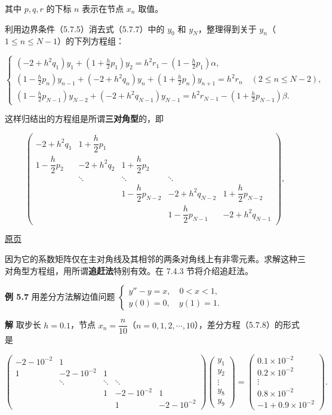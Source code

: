 \documentclass[
  10pt,
  fontset=fandol]{ctexart}
\begin{document}
其中 \(p,q,r\) 的下标 \(n\) 表示在节点 \(x_n\) 取值。

利用边界条件（5.7.5）消去式（5.7.7）中的 \(y_0\) 和 \(y_N\)，整理得到关于 \(y_n\)（\(1\le n\le N-1\)）的下列方程组：

\[
\begin{cases}
\displaystyle(-2+h^2q_1)y_1+\left(1+\frac h2p_1\right)y_2=h^2r_1-\left(1-\frac h2p_1\right)\alpha,\\[6pt]
\displaystyle\left(1-\frac h2p_n\right)y_{n-1}+(-2+h^2q_n)y_n+\left(1+\frac h2p_n\right)y_{n+1}=h^2r_n\quad(2\le n\le N-2),\\[6pt]
\displaystyle\left(1-\frac h2p_{N-1}\right)y_{N-2}+(-2+h^2q_{N-1})y_{N-1}=h^2r_{N-1}-\left(1+\frac h2p_{N-1}\right)\beta.
\end{cases}
\tag{5.7.8}
\]

这样归结出的方程组是所谓\textbf{三对角型}的，即

\[
\begin{pmatrix}
-2+h^2q_1 & 1+\dfrac h2p_1 & & & \\
1-\dfrac h2p_2 & -2+h^2q_2 & 1+\dfrac h2p_2 & & \\
& \ddots & \ddots & \ddots & \\
& & 1-\dfrac h2p_{N-2} & -2+h^2q_{N-2} & 1+\dfrac h2p_{N-2} \\
& & & 1-\dfrac h2p_{N-1} & -2+h^2q_{N-1}
\end{pmatrix},
\]

\href{../../source-images/pdf-150.jpeg}{原页}

因为它的系数矩阵仅在主对角线及其相邻的两条对角线上有非零元素。求解这种三对角型方程组，用所谓\textbf{追赶法}特别有效。在 7.4.3 节将介绍追赶法。

\textbf{例 5.7} 用差分方法解边值问题 \(\begin{cases}y''-y=x,\quad0<x<1,\\y(0)=0,\quad y(1)=1.\end{cases}\)

\textbf{解} 取步长 \(h=0.1\)，节点 \(x_n=\dfrac n{10}\)（\(n=0,1,2,\cdots,10\)），差分方程（5.7.8）的形式是

\[
\begin{pmatrix}
-2-10^{-2}&1&&&\\
1&-2-10^{-2}&1&&\\
&\ddots&\ddots&\ddots&\\
&&1&-2-10^{-2}&1\\
&&&1&-2-10^{-2}
\end{pmatrix}
\begin{pmatrix}y_1\\y_2\\\vdots\\y_8\\y_9\end{pmatrix}
=
\begin{pmatrix}0.1\times10^{-2}\\0.2\times10^{-2}\\\vdots\\0.8\times10^{-2}\\-1+0.9\times10^{-2}\end{pmatrix}.
\]
\end{document}
